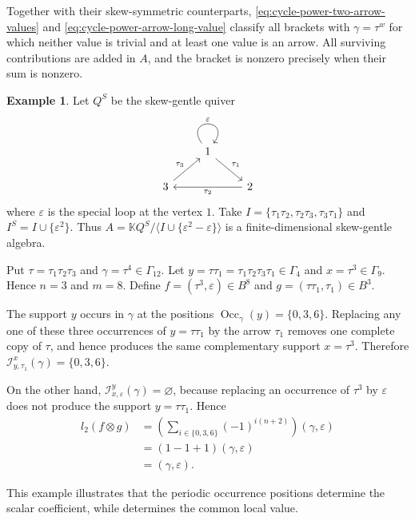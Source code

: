 \documentclass[11pt,a4paper,reqno]{amsart}
\newcommand{\mK}{\mathbb K}
\newcommand{\mI}{\mathcal I}
\newcommand{\Occ}{\operatorname{Occ}}
\newcommand{\para}[2]{(#1,#2)}
\newcommand{\ep}{\varepsilon}
\theoremstyle{plain}
\theoremstyle{definition}
\newtheorem{example}[example]{Example}
\numberwithin{equation}{section}
\begin{document}
	Together with their skew-symmetric counterparts,
	\eqref{eq:cycle-power-two-arrow-values} and
	\eqref{eq:cycle-power-arrow-long-value} classify all brackets with
	$\gamma=\tau^w$ for which neither value is trivial and at least
	one value is an arrow. All surviving contributions are added in
	$A$, and the bracket is nonzero precisely when their sum is nonzero.
	\begin{example}
		\label{ex:cycle-power-arrow-reassembly}
		Let $Q^S$ be the skew-gentle quiver
		\[\begin{tikzcd}
			& 1 & \\
			3 && 2
			\arrow["\ep", from=1-2, to=1-2, loop, in=55, out=125, distance=10mm]
			\arrow["{\tau_1}", from=1-2, to=2-3]
			\arrow["{\tau_3}", from=2-1, to=1-2]
			\arrow["{\tau_2}", from=2-3, to=2-1]
		\end{tikzcd}\]
		where $\ep$ is the special loop at the vertex $1$.  Take
		$I=\{\tau_1\tau_2, \tau_2\tau_3, \tau_3\tau_1\}$ and
		$I^S=I\cup\{\ep^2\}$.
		Thus
		$A= \mK Q^S/ \langle I\cup\{\ep^2-\ep\} \rangle$
		is a finite-dimensional skew-gentle algebra.
		
		Put
		$\tau=\tau_1\tau_2\tau_3$
		and
		$\gamma=\tau^4\in\Gamma_{12}$.
		Let
		$y=\tau\tau_1 = \tau_1\tau_2\tau_3\tau_1 \in\Gamma_4$
		and
		$x=\tau^3\in\Gamma_9$.
		Hence $n=3$ and $m=8$.
		Define $f=\para{\tau^3}{\ep}\in B^8$ and
		$g=\para{\tau\tau_1}{\tau_1}\in B^3$.
		
		The support $y$ occurs in $\gamma$ at the positions
		$\Occ_\gamma(y)=\{0,3,6\}$.
		Replacing any one of these three occurrences of
		$y=\tau\tau_1$
		by the arrow $\tau_1$ removes one complete copy of $\tau$, and hence
		produces the same complementary support
		$x=\tau^3$.
		Therefore
		$\mI_{y,\tau_1}^{x}(\gamma) = \{0,3,6\}$.
		
		On the other hand,
		$\mI_{x,\ep}^{y}(\gamma)=\varnothing$,
		because replacing an occurrence of $\tau^3$ by $\ep$ does not produce
		the support $y=\tau\tau_1$.  Hence
		\begin{align*}
			l_2(f\otimes g)
			&=
			\left(
			\sum_{i\in\{0,3,6\}}
			(-1)^{i(n+2)}
			\right)
			\para{\gamma}{\ep}
			\\
			&=
			(
			1-1+1
			)
			\para{\gamma}{\ep}
			\\
			&=
			\para{\gamma}{\ep}.
		\end{align*}
		
		This example illustrates that the periodic occurrence positions determine
		the scalar coefficient, while
		 determines the common local value.
	\end{example}
\end{document}
